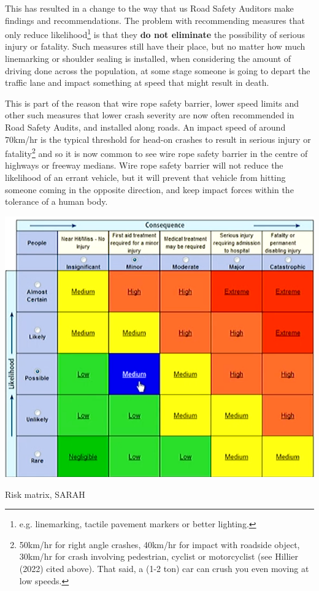 \documentclass{tufte-handout}
\begin{document}
This has resulted in a change to the way that us Road Safety Auditors make findings and recommendations. The problem with recommending measures that only reduce likelihood\footnote{e.g. linemarking, tactile pavement markers or better lighting.} is that they \textbf{do not eliminate} the possibility of serious injury or fatality. Such measures still have their place, but no matter how much linemarking or shoulder sealing is installed, when considering the amount of driving done across the population, at some stage someone is going to depart the traffic lane and impact something at speed that might result in death.  

This is part of the reason that wire rope safety barrier, lower speed limits and other such measures that lower crash severity are now often recommended in Road Safety Audits, and installed along roads. An impact speed of around 70km/hr is the typical threshold for head-on crashes to result in serious injury or fatality\footnote{50km/hr for right angle crashes, 40km/hr for impact with roadside object, 30km/hr for crash involving pedestrian, cyclist or motorcyclist (see Hillier (2022) cited above). That said, a (1-2 ton) car can crush you even moving at low speeds.} and so it is now common to see wire rope safety barrier in the centre of highways or freeway medians.  Wire rope safety barrier will not reduce the likelihood of an errant vehicle, but it will prevent that vehicle from hitting someone coming in the opposite direction, and keep impact forces within the tolerance of a human body\cite{TAC:2016aa}.  

\begin{marginfigure}
\includegraphics{SARAH_risk_matrix}
\caption{Risk matrix, SARAH}
\label{fig:SARAH}
\end{marginfigure}
\end{document}
